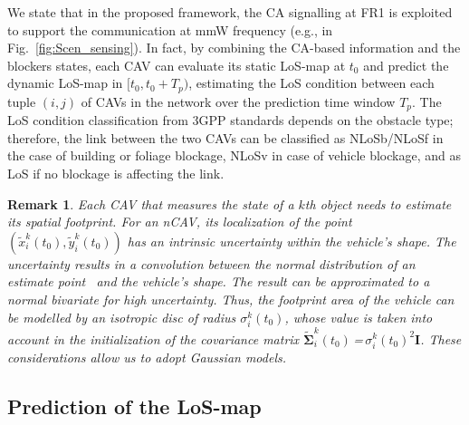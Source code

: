\documentclass[journal]{IEEEtran}
\newtheorem{remark}{Remark}
\begin{document}
We state that in the proposed framework, the CA signalling at FR1 is exploited to support the communication at mmW frequency (e.g., in Fig.~\ref{fig:Scen_sensing}). In fact, by combining the CA-based information and the blockers states, each CAV can evaluate its static LoS-map at $t_0$ and predict the dynamic LoS-map in $[t_0, t_0+T_p)$, estimating the LoS condition between each tuple $(i,j)$ of CAVs in the network over the prediction time window $T_p$. The LoS condition classification from 3GPP standards depends on the obstacle type; therefore, the link between the two CAVs can be classified as NLoSb/NLoSf in the case of building or foliage blockage, NLoSv in case of vehicle blockage, and as LoS if no blockage is affecting the link.

\begin{remark}
\normalfont 
Each CAV that measures the state of a $k$th object needs to estimate its spatial footprint.
For an nCAV, its localization of the point  $(\tilde{x}_i^{k}(t_0), \tilde{y}_i^{k}(t_0))$ has an intrinsic uncertainty within the vehicle's shape. The uncertainty results in a convolution between the normal distribution of an estimate point~\cite{s21010200} and the vehicle's shape. The result can be approximated to a normal bivariate for high uncertainty. Thus, the footprint area of the vehicle can be modelled by an isotropic disc of radius $\sigma_i^k(t_0)$, whose value is taken into account in the initialization of the covariance matrix $\boldsymbol{\tilde{\Sigma}}_i^k (t_0)$\,=\,$\sigma_i^k(t_0)^2 \mathbf{I}$. These considerations allow us to adopt Gaussian models.
\end{remark}

\subsection{Prediction of the LoS-map} \label{sec:pred}
\end{document}
